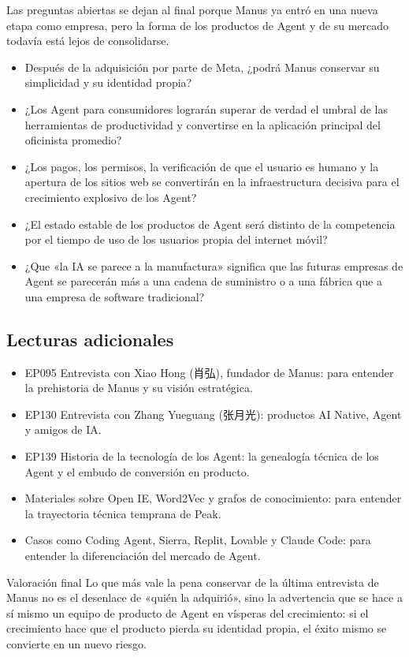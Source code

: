 Las preguntas abiertas se dejan al final porque Manus ya entró en una nueva etapa como empresa, pero la forma de los productos de Agent y de su mercado todavía está lejos de consolidarse.

\begin{itemize}
\item Después de la adquisición por parte de Meta, ¿podrá Manus conservar su simplicidad y su identidad propia?
\item ¿Los Agent para consumidores lograrán superar de verdad el umbral de las herramientas de productividad y convertirse en la aplicación principal del oficinista promedio?
\item ¿Los pagos, los permisos, la verificación de que el usuario es humano y la apertura de los sitios web se convertirán en la infraestructura decisiva para el crecimiento explosivo de los Agent?
\item ¿El estado estable de los productos de Agent será distinto de la competencia por el tiempo de uso de los usuarios propia del internet móvil?
\item ¿Que «la IA se parece a la manufactura» significa que las futuras empresas de Agent se parecerán más a una cadena de suministro o a una fábrica que a una empresa de software tradicional?
\end{itemize}

\subsection{Lecturas adicionales}

\begin{itemize}
\item EP095 Entrevista con Xiao Hong (肖弘), fundador de Manus: para entender la prehistoria de Manus y su visión estratégica.
\item EP130 Entrevista con Zhang Yueguang (张月光): productos AI Native, Agent y amigos de IA.
\item EP139 Historia de la tecnología de los Agent: la genealogía técnica de los Agent y el embudo de conversión en producto.
\item Materiales sobre Open IE, Word2Vec y grafos de conocimiento: para entender la trayectoria técnica temprana de Peak.
\item Casos como Coding Agent, Sierra, Replit, Lovable y Claude Code: para entender la diferenciación del mercado de Agent.
\end{itemize}

\begin{importantbox}{Valoración final}
Lo que más vale la pena conservar de la última entrevista de Manus no es el desenlace de «quién la adquirió», sino la advertencia que se hace a sí mismo un equipo de producto de Agent en vísperas del crecimiento: si el crecimiento hace que el producto pierda su identidad propia, el éxito mismo se convierte en un nuevo riesgo.
\end{importantbox}


